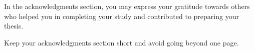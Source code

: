 \documentclass[a4paper,12pt,oneside]{report}
\begin{document}
\begin{acknowledgements} 

In the acknowledgments section, you may express your gratitude towards others who helped you in completing your study and contributed to preparing your thesis.

Keep your acknowledgments section short and avoid going beyond one page.

\end{acknowledgements}


\tableofcontents

\listoftables

\listoffigures





\end{document}
